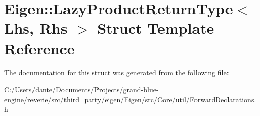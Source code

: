 \hypertarget{struct_eigen_1_1_lazy_product_return_type}{}\section{Eigen\+::Lazy\+Product\+Return\+Type$<$ Lhs, Rhs $>$ Struct Template Reference}
\label{struct_eigen_1_1_lazy_product_return_type}


The documentation for this struct was generated from the following file\+:\begin{DoxyCompactItemize}
\item 
C\+:/\+Users/dante/\+Documents/\+Projects/grand-\/blue-\/engine/reverie/src/third\+\_\+party/eigen/\+Eigen/src/\+Core/util/Forward\+Declarations.\+h\end{DoxyCompactItemize}
